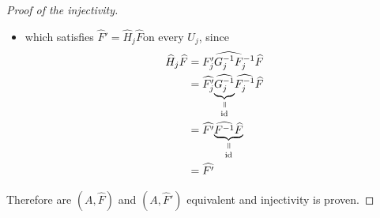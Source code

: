 \begin{proof}[Proof of the injectivity]
\begin{itemize}
    \item which satisfies $\hat F'=\hat H_j\hat F$
      on every $U_j$, since
      \begin{align*}
        \hat H_j\hat F&= \widehat{F_j'G_{j}^{-1}F_j^{-1}} \hat F
        \\&= \hat{F_j'}
        \underset{\id}{%
          \underset{\text{\rotatebox[origin=c]{-90}{$=$}}}{%
            \underbrace{%
              \hat{G_{j}^{-1}}
            }
          }
        }
        \hat{F_j^{-1}} \hat F
        \\&= \hat{F'}
        \underset{\id}{%
          \underset{\text{\rotatebox[origin=c]{-90}{$=$}}}{%
            \underbrace{%
              \hat{F^{-1}} \hat F
            }
          }
        }
        \\&= \hat{F'}
      \end{align*}
  \end{itemize}
  Therefore are $(A,\hat F)$ and $(A,\hat F')$ equivalent and injectivity is
  proven.
  \begin{comment}
    \textbf{First look at injectivity:}
    Consider the two elements $(\cM,\nabla,\hat f)$ and $(\cM',\nabla',\hat f')$
    of $\cH$ which map to same cohomology class
    \[
      \exp((\cM,\nabla,\hat f))=\lambda=\exp((\cM',\nabla',\hat f'))
        \in H^1(S^1;\Lambda(A^0)) \,.
    \]
    Since we can use refined coverings, it is possible to find a finite covering
    $\cU=\{U_j;j\in J\}$ of $S^1$ such that $\lambda$ is the class of the
    cocycles $(f_lf_j^{-1})$ and $(f_l',f_j'^{-1})$, where $f_j$,$f_j'$ are
    defined on $U_j$.
    Since $[(f_lf_j^{-1})]=[(f_l'f_j'^{-1})]$ there exists a
    $0$-cochain $(g_j)$ of the sheaf $\Aut^{<0}(\tilde\cM^{nf})$ relative to the
    covering $(I_j)$, such that
    \[
      f_l'f_j'^{-1}=g_lf_lf_j^{-1}g_j^{-1} \text{ on } I_j\cap I_l.
    \]
    If we set $\sigma=f_j^{-1}g_{j}^{-1}f_j'$ on $I_{j}$, we get a horizontal
    section\TODO[~on~???], thus\TODO[why?] it satisfies $\sigma\circ\hat{f'}=\hat
    f$. Therefore are $(\cM,\nabla,\hat f)$ and $(\cM',\nabla',\hat{f'})$
    isomorphic and injectivity is proven.
  \end{comment}
\end{proof}

